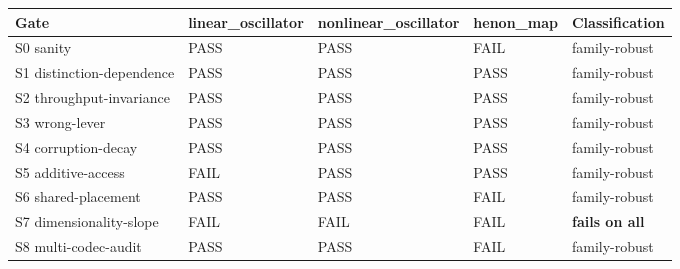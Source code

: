 \documentclass[
  11pt,
]{article}
\newcounter{none} %
\begin{document}
{\def\LTcaptype{none} %
\begin{longtable}[]{@{}
  >{\raggedright\arraybackslash}p{}
  >{\raggedright\arraybackslash}p{}
  >{\raggedright\arraybackslash}p{}
  >{\raggedright\arraybackslash}p{}
  >{\raggedright\arraybackslash}p{}@{}}
\toprule\noalign{}
\begin{minipage}[b]{\linewidth}\raggedright
Gate
\end{minipage} &
\begin{minipage}[b]{\linewidth}\raggedright
linear\_oscillator
\end{minipage} &
\begin{minipage}[b]{\linewidth}\raggedright
nonlinear\_oscillator
\end{minipage} &
\begin{minipage}[b]{\linewidth}\raggedright
henon\_map
\end{minipage} &
\begin{minipage}[b]{\linewidth}\raggedright
Classification
\end{minipage} \\
\midrule\noalign{}
\endhead
\bottomrule\noalign{}
\endlastfoot
S0 sanity & PASS & PASS & FAIL &
family-robust \\
S1 distinction-dependence & PASS & PASS & PASS &
family-robust \\
S2 throughput-invariance & PASS & PASS & PASS &
family-robust \\
S3 wrong-lever & PASS & PASS & PASS &
family-robust \\
S4 corruption-decay & PASS & PASS & PASS &
family-robust \\
S5 additive-access & FAIL & PASS & PASS &
family-robust \\
S6 shared-placement & PASS & PASS & FAIL &
family-robust \\
S7 dimensionality-slope & FAIL & FAIL & FAIL &
\textbf{fails on all} \\
S8 multi-codec-audit & PASS & PASS & FAIL &
family-robust \\
\end{longtable}
}
\end{document}
